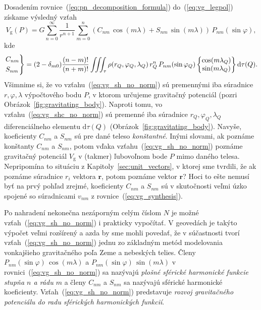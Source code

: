 \documentclass[a4paper, 12pt]{book}
\newcommand{\diff}{\mathrm d}
\newcommand{\gidx}{\mathrm g}
\let\vec\mathbf
\begin{document}
Dosadením rovnice~(\ref{eq:pn_decomposition_formula}) do~(\ref{eq:vg_legpol}) 
získame výsledný vzťah
%
\begin{equation}
\label{eq:vg_sh_no_norm}
V_\gidx(P) = G \sum_{n = 0}^\infty \frac{1}{r^{n + 1}} \sum_{m = 0}^{n} \left( 
C_{nm} \, \cos(m\lambda) + S_{nm} \, \sin(m\lambda)\right) \, 
P_{nm}(\sin\varphi){,}
\end{equation}
%
kde
%
\begin{equation}
\label{eq:vg_shc_no_norm}
\begin{rcases}
C_{nm}\\
S_{nm}
\end{rcases}
= (2 - \delta_{m0}) \frac{(n - m)!}{(n + m)!} \iiint_{\tau} \rho(r_Q, 
\varphi_Q, \lambda_Q) \, r_Q^n \, P_{nm}(\sin\varphi_Q)
%
\begin{Bmatrix}
\cos(m\lambda_Q)\\
\sin(m\lambda_Q)
\end{Bmatrix}
%
\diff\tau(Q){.}
\end{equation}
%
Všimnime si, že vo vzťahu~(\ref{eq:vg_sh_no_norm}) sú premennými iba súradnice 
$r, \varphi, \lambda$ výpočtového bodu $P$, v ktorom určujeme gravitačný 
potenciál (pozri Obrázok~\ref{fig:gravitating_body}).  Naproti tomu, vo 
vzťahu~(\ref{eq:vg_shc_no_norm}) sú premenné iba súradnice $r_Q,\varphi_Q, 
\lambda_Q$ diferenciálneho elementu $\diff\tau(Q)$ 
(Obrázok~\ref{fig:gravitating_body}).  Navyše, koeficienty $C_{nm}$ a $S_{nm}$ 
sú pre dané teleso \emph{konštantné}.  Inými slovami, ak poznáme konštanty 
$C_{nm}$ a $S_{nm}$, potom vďaka vzťahu~(\ref{eq:vg_sh_no_norm}) poznáme 
gravitačný potenciál $V_\gidx$ v (takmer) ľubovoľnom bode $P$ mimo daného 
telesa.  Nepripomína to situáciu z Kapitoly~\ref{sec:unit_vectors}, v ktorej 
sme tvrdili, že ak poznáme súradnice $r_i$ vektora $\vec r$, potom poznáme 
vektor $\vec r$?  Hoci to ešte nemusí byť na prvý pohľad zrejmé, koeficienty 
$C_{nm}$ a $S_{nm}$ sú v skutočnosti veľmi úzko spojené so súradnicami $v_{nm}$ 
z rovnice~(\ref{eq:vg_synthesis}).

Po nahradení nekonečna nezáporným celým číslom $N$ je možné 
vzťah~(\ref{eq:vg_sh_no_norm}) i prakticky vypočítať.  V geovedách je takýto 
výpočet veľmi rozšírený a azda by sme mohli povedať, že v súčastnosti tvorí 
vzťah~(\ref{eq:vg_sh_no_norm}) jednu zo základným metód modelovania vonkajšieho 
gravitačného poľa Zeme a nebeských telies.  Členy $P_{nm}(\sin\varphi) \, 
\cos(m\lambda)$ a $ P_{nm}(\sin\varphi) \, \sin(m\lambda)$ 
v rovnici~(\ref{eq:vg_sh_no_norm}) sa nazývajú \emph{plošné sférické harmonické 
funkcie stupňa $n$ a rádu $m$} a členy $C_{nm}$ a $S_{nm}$ sa nazývajú sférické 
harmonické koeficienty.  Vzťah~(\ref{eq:vg_sh_no_norm}) predstavuje 
\emph{rozvoj gravitačného potenciálu do radu sférických harmonických funkcií}.
\end{document}
